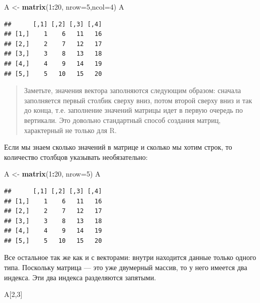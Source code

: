 \documentclass[
]{book}
\newenvironment{Shaded}{\begin{snugshade}}{\end{snugshade}}
\newcommand{\DataTypeTok}[1]{\textcolor[rgb]{0.13,0.29,0.53}{#1}}
\newcommand{\DecValTok}[1]{\textcolor[rgb]{0.00,0.00,0.81}{#1}}
\newcommand{\KeywordTok}[1]{\textcolor[rgb]{0.13,0.29,0.53}{\textbf{#1}}}
\newcommand{\NormalTok}[1]{#1}
\newcommand{\OperatorTok}[1]{\textcolor[rgb]{0.81,0.36,0.00}{\textbf{#1}}}
\newcommand{\StringTok}[1]{\textcolor[rgb]{0.31,0.60,0.02}{#1}}
\begin{document}
\begin{Shaded}
\begin{Highlighting}[]
\NormalTok{A <-}\StringTok{ }\KeywordTok{matrix}\NormalTok{(}\DecValTok{1}\OperatorTok{:}\DecValTok{20}\NormalTok{, }\DataTypeTok{nrow=}\DecValTok{5}\NormalTok{,}\DataTypeTok{ncol=}\DecValTok{4}\NormalTok{)}
\NormalTok{A}
\end{Highlighting}
\end{Shaded}

\begin{verbatim}
##      [,1] [,2] [,3] [,4]
## [1,]    1    6   11   16
## [2,]    2    7   12   17
## [3,]    3    8   13   18
## [4,]    4    9   14   19
## [5,]    5   10   15   20
\end{verbatim}

\begin{quote}
Заметьте, значения вектора заполняются следующим образом: сначала заполняется первый столбик сверху вниз, потом второй сверху вниз и так до конца, т.е. заполнение значений матрицы идет в первую очередь по вертикали. Это довольно стандартный способ создания матриц, характерный не только для R.
\end{quote}

Если мы знаем сколько значений в матрице и сколько мы хотим строк, то количество столбцов указывать необязательно:

\begin{Shaded}
\begin{Highlighting}[]
\NormalTok{A <-}\StringTok{ }\KeywordTok{matrix}\NormalTok{(}\DecValTok{1}\OperatorTok{:}\DecValTok{20}\NormalTok{, }\DataTypeTok{nrow=}\DecValTok{5}\NormalTok{)}
\NormalTok{A}
\end{Highlighting}
\end{Shaded}

\begin{verbatim}
##      [,1] [,2] [,3] [,4]
## [1,]    1    6   11   16
## [2,]    2    7   12   17
## [3,]    3    8   13   18
## [4,]    4    9   14   19
## [5,]    5   10   15   20
\end{verbatim}

Все остальное так же как и с векторами: внутри находится данные только одного типа. Поскольку матрица --- это уже двумерный массив, то у него имеется два индекса. Эти два индекса разделяются запятыми.

\begin{Shaded}
\begin{Highlighting}[]
\NormalTok{A[}\DecValTok{2}\NormalTok{,}\DecValTok{3}\NormalTok{]}
\end{Highlighting}
\end{Shaded}
\end{document}
